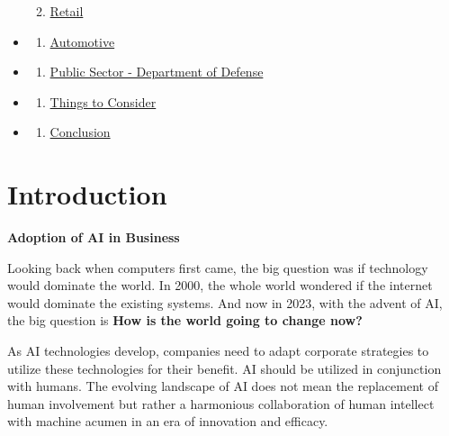 \documentclass[
]{article}
\providecommand{\tightlist}{%
  \setlength{\itemsep}{0pt}\setlength{\parskip}{0pt}}
\begin{document}
\begin{itemize}
  \begin{enumerate}
  \def\labelenumi{\arabic{enumi}.}
  \setcounter{enumi}{6}
  \tightlist
  \item
    \href{07-Retail.Rmd}{Retail}
  \end{enumerate}
\item
  \begin{enumerate}
  \def\labelenumi{\arabic{enumi}.}
  \setcounter{enumi}{7}
  \tightlist
  \item
    \href{08-Automotive.Rmd}{Automotive}
  \end{enumerate}
\item
  \begin{enumerate}
  \def\labelenumi{\arabic{enumi}.}
  \setcounter{enumi}{8}
  \tightlist
  \item
    \href{09-Public-Sector-Department-of-Defense.Rmd}{Public Sector - Department of Defense}
  \end{enumerate}
\item
  \begin{enumerate}
  \def\labelenumi{\arabic{enumi}.}
  \setcounter{enumi}{9}
  \tightlist
  \item
    \href{10-Things-to-Consider.Rmd}{Things to Consider}
  \end{enumerate}
\item
  \begin{enumerate}
  \def\labelenumi{\arabic{enumi}.}
  \setcounter{enumi}{10}
  \tightlist
  \item
    \href{11-Conclusion.Rmd}{Conclusion}
  \end{enumerate}
\end{itemize}

\hypertarget{introduction}{%
\section{Introduction}\label{introduction}}

\textbf{Adoption of AI in Business}

Looking back when computers first came, the big question was if technology would dominate the world. In 2000, the whole world wondered if the internet would dominate the existing systems. And now in 2023, with the advent of AI, the big question is \textbf{How is the world going to change now?}

As AI technologies develop, companies need to adapt corporate strategies to utilize these technologies for their benefit. AI should be utilized in conjunction with humans. The evolving landscape of AI does not mean the replacement of human involvement but rather a harmonious collaboration of human intellect with machine acumen in an era of innovation and efficacy.
\end{document}
